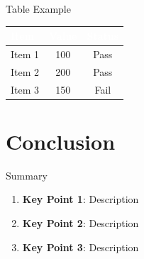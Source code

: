 \documentclass[aspectratio=169, 11pt]{beamer}
\begin{document}
\begin{frame}{Table Example}
    \begin{center}
        \begin{tabular}{lcc}
            \hline
            \rowcolor{mbzuai-dark-navy}
            \textcolor{white}{\textbf{Item}} & \textcolor{white}{\textbf{Value}} & \textcolor{white}{\textbf{Status}} \\
            \hline
            \rowcolor{mbzuai-light-gray}
            Item 1 & 100 & Pass \\
            Item 2 & 200 & Pass \\
            \rowcolor{mbzuai-light-gray}
            Item 3 & 150 & Fail \\
            \hline
        \end{tabular}
    \end{center}
\end{frame}

\section{Conclusion}

\begin{frame}{Summary}
    \begin{enumerate}
        \item \textcolor{mbzuai-navy}{\textbf{Key Point 1}}: Description
        \item \textcolor{mbzuai-navy}{\textbf{Key Point 2}}: Description
        \item \textcolor{mbzuai-navy}{\textbf{Key Point 3}}: Description
    \end{enumerate}
\end{frame}

{
\begin{frame}[t]
    \mbzuaiThankYou
\end{frame}
}
\end{document}
